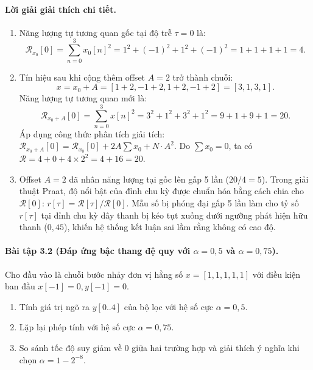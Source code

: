 \paragraph{Lời giải giải thích chi tiết.}
\begin{enumerate}[label=\alph*)]
    \item Năng lượng tự tương quan gốc tại độ trễ $\tau = 0$ là:
    \[
    \mathcal{R}_{x_0}[0] = \sum_{n=0}^{3} x_0[n]^2 = 1^2 + (-1)^2 + 1^2 + (-1)^2 = 1 + 1 + 1 + 1 = 4.
    \]
    \item Tín hiệu sau khi cộng thêm offset $A = 2$ trở thành chuỗi:
    \[
    x = x_0 + A = [1+2, -1+2, 1+2, -1+2] = [3, 1, 3, 1].
    \]
    Năng lượng tự tương quan mới là:
    \[
    \mathcal{R}_{x_0+A}[0] = \sum_{n=0}^{3} x[n]^2 = 3^2 + 1^2 + 3^2 + 1^2 = 9 + 1 + 9 + 1 = 20.
    \]
    Áp dụng công thức phân tích giải tích: $\mathcal{R}_{x_0+A}[0] = \mathcal{R}_{x_0}[0] + 2A\sum x_0 + N\cdot A^2$. Do $\sum x_0 = 0$, ta có $\mathcal{R} = 4 + 0 + 4 \times 2^2 = 4 + 16 = 20$.
    \item Offset $A = 2$ đã nhân năng lượng tại gốc lên gấp 5 lần ($20 / 4 = 5$). Trong giải thuật Praat, độ nổi bật của đỉnh chu kỳ được chuẩn hóa bằng cách chia cho $\mathcal{R}[0]$: $r[\tau] = \mathcal{R}[\tau] / \mathcal{R}[0]$. Mẫu số bị phóng đại gấp 5 lần làm cho tỷ số $r[\tau]$ tại đỉnh chu kỳ dây thanh bị kéo tụt xuống dưới ngưỡng phát hiện hữu thanh ($0{,}45$), khiến hệ thống kết luận sai lầm rằng không có cao độ.
\end{enumerate}

\paragraph{Bài tập 3.2 (Đáp ứng bậc thang đệ quy với $\alpha = 0{,}5$ và $\alpha = 0{,}75$).}
Cho đầu vào là chuỗi bước nhảy đơn vị hằng số $x = [1, 1, 1, 1, 1]$ với điều kiện ban đầu $x[-1] = 0, y[-1] = 0$.
\begin{enumerate}[label=\alph*)]
    \item Tính giá trị ngõ ra $y[0..4]$ của bộ lọc với hệ số cực $\alpha = 0{,}5$.
    \item Lặp lại phép tính với hệ số cực $\alpha = 0{,}75$.
    \item So sánh tốc độ suy giảm về 0 giữa hai trường hợp và giải thích ý nghĩa khi chọn $\alpha = 1 - 2^{-8}$.
\end{enumerate}

